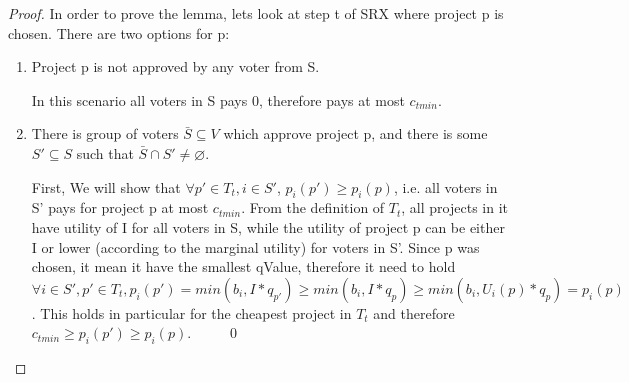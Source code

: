 \documentclass[runningheads]{llncs}
\newcommand{\kibitz}[2]{\ifnum\Comments=1{\color{#1}{#2}}\fi}
\newcommand{\rmr}[1]{\kibitz{red}{[Reshef says:#1]}}
\newcommand{\rf}[1]{\kibitz{blue}{[Roy says:#1]}}
\begin{document}
\begin{proof}
In order to prove the lemma, lets look at step t of SRX where project p is chosen. There are two options for p:

\begin{enumerate}
    \item Project p is not approved by any voter from S.
    
    In this scenario all voters in S pays 0, therefore pays at most $c_{tmin}$.
    
    \item There is group of voters $\bar{S} \subseteq V$ which approve project p, and there is some $S'\subseteq S$ such that $\bar{S} \cap S'\neq \varnothing$.
    
    First, We will show that $\forall p'\in T_t, i\in S'$, $p_i(p')\geq p_i(p)$, i.e. all voters in S' pays for project p at most $c_{tmin}$.
    From the definition of $T_t$, all projects in it have utility of I for all voters in S, while the utility of project p can be either I or lower (according to the marginal utility) for voters in S'. Since p was chosen, it mean it have the smallest qValue, therefore it need to hold $\forall i\in S', p'\in T_t, p_i(p')=min(b_i,I*q_{p'})\geq min(b_i,I*q_p)\geq min(b_i,U_i(p)*q_p)=p_i(p)$. This holds in particular for the cheapest project in $T_t$ and therefore $c_{tmin}\geq p_i(p')\geq p_i(p)$.~~~~~\qed
\end{enumerate}
\end{proof}


\end{document}
